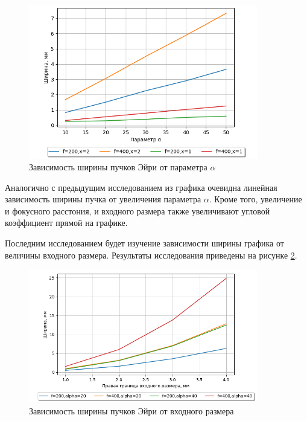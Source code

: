 {    \begin{figure}[H]
        \begin{center}
            \includegraphics[width=10cm]{plots/!graphics_alpha_no_root.png}
            \caption{Зависимость ширины пучков Эйри от параметра $\alpha$}
            \label{graphics_alpha}
        \end{center}
    \end{figure}

    Аналогично с предыдущим исследованием из графика очевидна линейная зависимость ширины пучка от увеличения параметра $\alpha$.
    Кроме того, увеличение и фокусного расстония, и входного размера также увеличивают угловой коэффициент прямой на графике.

    Последним исследованием будет изучение зависимости ширины графика от величины входного размера. Результаты исследования приведены на рисунке \ref{graphics_input}.

    \begin{figure}[H]
        \begin{center}
            \includegraphics[width=10cm]{plots/!graphics_input.png}
            \caption{Зависимость ширины пучков Эйри от входного размера}
            \label{graphics_input}
        \end{center}
    \end{figure}

}
